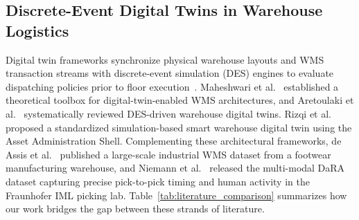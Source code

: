 \documentclass[conference]{IEEEtran}
\begin{document}
\subsection{Discrete-Event Digital Twins in Warehouse Logistics}
\label{sec:rel_dt}
Digital twin frameworks synchronize physical warehouse layouts and WMS transaction streams with discrete-event simulation (DES) engines to evaluate dispatching policies prior to floor execution~\cite{maheshwari2023digital,aretoulaki2024discrete,rizqi2024simulation}. Maheshwari et al.~\cite{maheshwari2023digital} established a theoretical toolbox for digital-twin-enabled WMS architectures, and Aretoulaki et al.~\cite{aretoulaki2024discrete} systematically reviewed DES-driven warehouse digital twins. Rizqi et al.~\cite{rizqi2024simulation} proposed a standardized simulation-based smart warehouse digital twin using the Asset Administration Shell. Complementing these architectural frameworks, de Assis et al.~\cite{assis2025order} published a large-scale industrial WMS dataset from a footwear manufacturing warehouse, and Niemann et al.~\cite{niemann2026dara} released the multi-modal DaRA dataset capturing precise pick-to-pick timing and human activity in the Fraunhofer IML picking lab. Table~\ref{tab:literature_comparison} summarizes how our work bridges the gap between these strands of literature.
\end{document}
